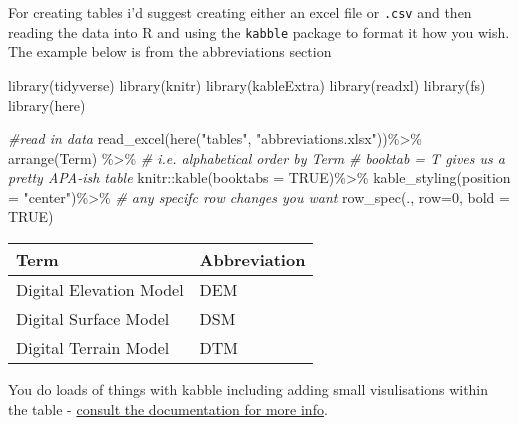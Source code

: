 \documentclass[
  12pt,
  oneside]{book}
\newenvironment{Shaded}{\begin{snugshade}}{\end{snugshade}}
\newcommand{\AttributeTok}[1]{\textcolor[rgb]{0.77,0.63,0.00}{#1}}
\newcommand{\CommentTok}[1]{\textcolor[rgb]{0.56,0.35,0.01}{\textit{#1}}}
\newcommand{\ConstantTok}[1]{\textcolor[rgb]{0.00,0.00,0.00}{#1}}
\newcommand{\DecValTok}[1]{\textcolor[rgb]{0.00,0.00,0.81}{#1}}
\newcommand{\FunctionTok}[1]{\textcolor[rgb]{0.00,0.00,0.00}{#1}}
\newcommand{\NormalTok}[1]{#1}
\newcommand{\SpecialCharTok}[1]{\textcolor[rgb]{0.00,0.00,0.00}{#1}}
\newcommand{\StringTok}[1]{\textcolor[rgb]{0.31,0.60,0.02}{#1}}
\begin{document}
For creating tables i'd suggest creating either an excel file or \texttt{.csv} and then reading the data into R and using the \texttt{kabble} package to format it how you wish. The example below is from the abbreviations section

\begin{Shaded}
\begin{Highlighting}[]
\FunctionTok{library}\NormalTok{(tidyverse)}
\FunctionTok{library}\NormalTok{(knitr)}
\FunctionTok{library}\NormalTok{(kableExtra)}
\FunctionTok{library}\NormalTok{(readxl)}
\FunctionTok{library}\NormalTok{(fs)}
\FunctionTok{library}\NormalTok{(here)}

\CommentTok{\#read in data}
\FunctionTok{read\_excel}\NormalTok{(}\FunctionTok{here}\NormalTok{(}\StringTok{"tables"}\NormalTok{, }\StringTok{"abbreviations.xlsx"}\NormalTok{))}\SpecialCharTok{\%\textgreater{}\%}
  \FunctionTok{arrange}\NormalTok{(Term) }\SpecialCharTok{\%\textgreater{}\%} \CommentTok{\# i.e. alphabetical order by Term}
  \CommentTok{\# booktab = T gives us a pretty APA{-}ish table}
\NormalTok{  knitr}\SpecialCharTok{::}\FunctionTok{kable}\NormalTok{(}\AttributeTok{booktabs =} \ConstantTok{TRUE}\NormalTok{)}\SpecialCharTok{\%\textgreater{}\%} 
  \FunctionTok{kable\_styling}\NormalTok{(}\AttributeTok{position =} \StringTok{"center"}\NormalTok{)}\SpecialCharTok{\%\textgreater{}\%}
  \CommentTok{\# any specifc row changes you want}
    \FunctionTok{row\_spec}\NormalTok{(.,}
  \AttributeTok{row=}\DecValTok{0}\NormalTok{,}
  \AttributeTok{bold =} \ConstantTok{TRUE}\NormalTok{)}
\end{Highlighting}
\end{Shaded}

\begin{table}[H]
\centering
\begin{tabular}{ll}
\toprule
\textbf{Term} & \textbf{Abbreviation}\\
\midrule
Digital Elevation Model & DEM\\
Digital Surface Model & DSM\\
Digital Terrain Model & DTM\\
\bottomrule
\end{tabular}
\end{table}

You do loads of things with kabble including adding small visulisations within the table - \href{https://cran.r-project.org/web/packages/kableExtra/vignettes/awesome_table_in_html.html\#Overview}{consult the documentation for more info}.
\end{document}
